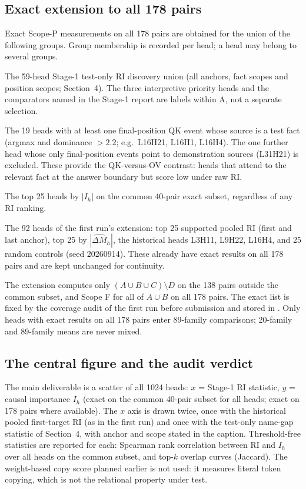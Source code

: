 \subsection{Exact extension to all 178 pairs}
Exact Scope-P measurements on all 178 pairs are obtained for the union of the following groups. Group membership is recorded per head; a head may belong to several groups.
\begin{description}[itemsep=1pt,leftmargin=0.9cm]
\item[A.] The 59-head Stage-1 test-only RI discovery union (all anchors, fact scopes and position scopes; Section~4). The three interpretive priority heads and the comparators named in the Stage-1 report are labels within A, not a separate selection.
\item[B.] The 19 heads with at least one final-position QK event whose source is a test fact (argmax and dominance $>2.2$; e.g.\ L16H21, L16H1, L16H4). The one further head whose only final-position events point to demonstration sources (L31H21) is excluded. These provide the QK-versus-OV contrast: heads that attend to the relevant fact at the answer boundary but score low under raw RI.
\item[C.] The top 25 heads by $|I_h|$ on the common 40-pair exact subset, regardless of any RI ranking.
\item[D.] The 92 heads of the first run's extension: top 25 supported pooled RI (first and last anchor), top 25 by $|\widehat{\Delta M}_h|$, the historical heads L3H11, L9H22, L16H4, and 25 random controls (seed 20260914). These already have exact results on all 178 pairs and are kept unchanged for continuity.
\end{description}
The extension computes only $(A\cup B\cup C)\setminus D$ on the 138 pairs outside the common subset, and Scope F for all of $A\cup B$ on all 178 pairs. The exact list is fixed by the coverage audit of the first run before submission and stored in . Only heads with exact results on all 178 pairs enter 89-family comparisons; 20-family and 89-family means are never mixed.

\subsection{The central figure and the audit verdict}
The main deliverable is a scatter of all 1024 heads: $x$ = Stage-1 RI statistic, $y$ = causal importance $I_h$ (exact on the common 40-pair subset for all heads; exact on 178 pairs where available). The $x$ axis is drawn twice, once with the historical pooled first-target RI (as in the first run) and once with the test-only name-gap statistic of Section~4, with anchor and scope stated in the caption. Threshold-free statistics are reported for each: Spearman rank correlation between RI and $I_h$ over all heads on the common subset, and top-$k$ overlap curves (Jaccard). The weight-based copy score planned earlier is not used: it measures literal token copying, which is not the relational property under test.

